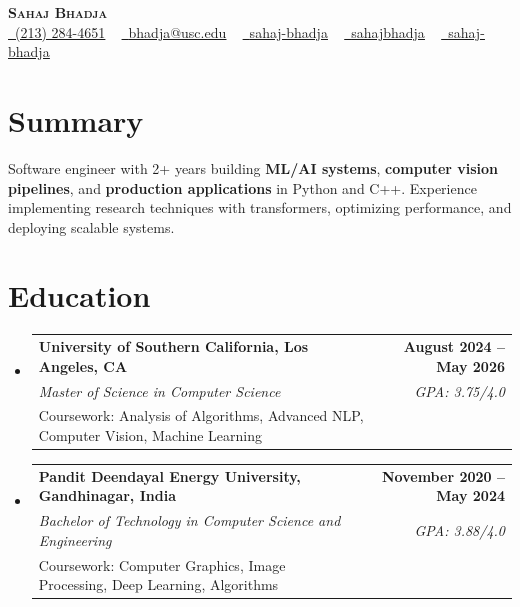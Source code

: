 \documentclass[letterpaper,10pt]{article}
\makeatletter
\newcommand{\resumeEduSubheading}[5]{\vspace{-1pt}\item\begin{tabular*}{1.0\textwidth}[t]{l@{\extracolsep{\fill}}r}\textbf{#1} & \textbf{\small #2} \\\textit{\small #3} & \textit{\small #4} \\\small #5 & \\\end{tabular*}\vspace{-4pt}}
\newcommand{\resumeSubHeadingListStart}{\begin{itemize}[leftmargin=0.0in, label={}]}
\newcommand{\resumeSubHeadingListEnd}{\end{itemize}}
\makeatother
\begin{document}
\begin{center}
{\Huge \scshape \textbf{Sahaj Bhadja}} \\ \vspace{1pt}
\small \href{tel:(213) 284-4651}{\faPhone\ \underline{(213) 284-4651}} ~ \href{mailto:bhadja@usc.edu}{\raisebox{-0.2\height}\faEnvelope\ \underline{bhadja@usc.edu}} ~
\href{https://www.linkedin.com/in/sahaj-bhadja/}{\raisebox{-0.2\height}\faLinkedin\ \underline{sahaj-bhadja}} ~ \href{https://github.com/SAHAJ-BHADJA}{\raisebox{-0.2\height}\faGithub\ \underline{sahajbhadja}} ~
\href{https://sahaj-bhadja.vercel.app/}{\raisebox{-0.2\height}\faGlobe\ \underline{sahaj-bhadja}}
\end{center}
\vspace{-18pt}
\section{Summary}
\begin{itemize}[leftmargin=0.15in, label={}]
\small{\item{Software engineer with 2+ years building \textbf{ML/AI systems}, \textbf{computer vision pipelines}, and \textbf{production applications} in Python and C++. Experience implementing research techniques with transformers, optimizing performance, and deploying scalable systems.}}
\end{itemize}
\vspace{-16pt}
\section{Education}
\resumeSubHeadingListStart
\resumeEduSubheading{University of Southern California, Los Angeles, CA}{August 2024 -- May 2026}{Master of Science in Computer Science}{GPA: 3.75/4.0}{Coursework: Analysis of Algorithms, Advanced NLP, Computer Vision, Machine Learning}
\vspace{-9pt}
\resumeEduSubheading{Pandit Deendayal Energy University, Gandhinagar, India}{November 2020 -- May 2024}{Bachelor of Technology in Computer Science and Engineering}{GPA: 3.88/4.0}{Coursework: Computer Graphics, Image Processing, Deep Learning, Algorithms}
\resumeSubHeadingListEnd
\vspace{-14pt}
\end{document}
